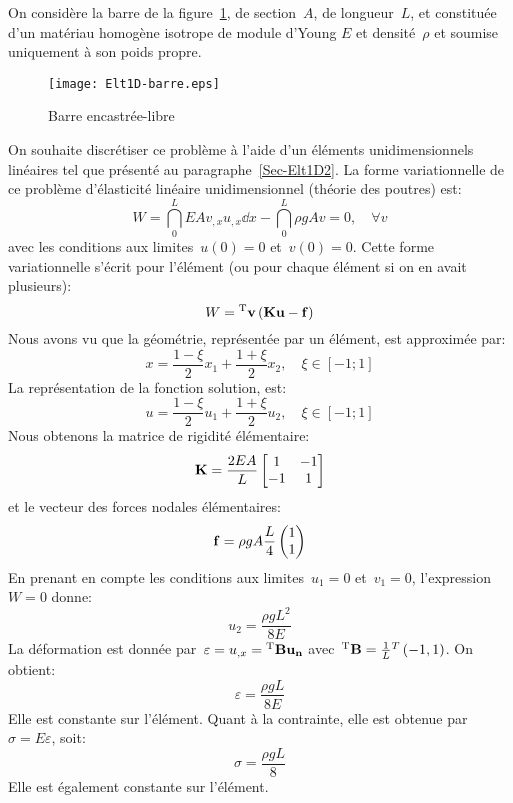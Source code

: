 On considère la barre de la figure~\ref{fig-barre}, de section~$A$, de longueur~$L$, et constituée d'un matériau homogène isotrope de module d'Young $E$ et densité~$\rho$ et soumise uniquement à son poids propre.
\begin{figure}[h!]
\centering
\texttt{[image: Elt1D-barre.eps]}
\caption{Barre encastrée-libre}\label{fig-barre}
\end{figure}
On souhaite discrétiser ce problème à l'aide d'un éléments unidimensionnels linéaires
tel que présenté au paragraphe~\ref{Sec-Elt1D2}.
\medskipvm
La forme variationnelle de ce problème d'élasticité linéaire unidimensionnel (théorie des poutres) est:
\begin{equation}
W=\dint_0^L EA v_{,x}u_{,x} \dd x - \dint_0^L \rho g A v = 0, \quad \forall v
\end{equation}
avec les conditions aux limites~$u(0)=0$ et~$v(0)=0$.
Cette forme variationnelle s'écrit pour l'élément (ou pour chaque élément si on en avait plusieurs):
\begin{equation}
W = \LL{v} \left( \MM{K}\VV{u} - \VV{f} \right)
\end{equation}
\medskipvm
Nous avons vu que la géométrie, représentée par un élément, est approximée par:
\begin{equation} x=\frac{1-\xi}2 x_1 + \frac{1+\xi}2 x_2, \quad \xi\in[-1;1] \end{equation}
La représentation de la fonction solution, est:
\begin{equation} u = \frac{1-\xi}2 u_1 + \frac{1+\xi}2 u_2, \quad \xi\in[-1;1] \end{equation}
\medskipvm
Nous obtenons la matrice de rigidité élémentaire:
\begin{equation} 
\MM{K} = \frac{2EA}L \MM*{1 & -1\\ -1& 1}
\end{equation}
et le vecteur des forces nodales élémentaires:
\begin{equation} 
\VV{f} = \rho g A \frac{L}4 \VV*{1 \\1}
\end{equation}
\medskipvm
En prenant en compte les conditions aux limites~$u_1=0$ et~$v_1=0$, l'expression~$W=0$ donne:
\begin{equation} u_2 = \frac{\rho g L^2}{8 E} \end{equation}
\medskipvm
La déformation est donnée par~$\varepsilon=u_{,x}=\LL{B}\VV{u_n}$ avec~${}^\mathrm{T}\mathbf{B}=\frac1L {}^T\left( -1, 1\right)$.
On obtient:
\begin{equation}
\varepsilon=\frac{\rho g L}{8 E}
\end{equation} 
Elle est constante sur l'élément. Quant à la contrainte, elle est obtenue par~$\sigma=E\varepsilon$, soit:
\begin{equation}\sigma=\frac{\rho g L}8\end{equation}
Elle est également constante sur l'élément.

